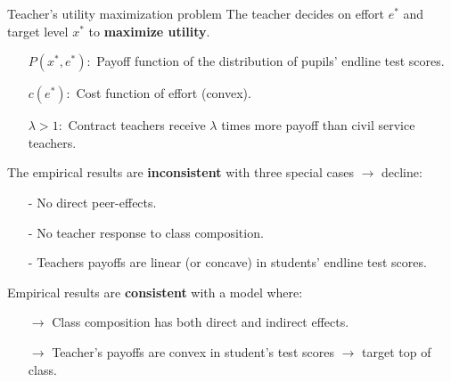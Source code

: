 \documentclass[9pt]{beamer}
\newcommand{\comment}[1]{}  %
\numberwithin{equation}{section}
\begin{document}
\begin{frame}{Teacher's utility maximization problem}
  The teacher decides on effort $e^{*}$ and target level $x^{*}$ to \textbf{maximize utility}.
  \begin{itemize}
    \item[$P(x^{*},e^{*}):$] Payoff function of the distribution of pupils' endline test scores.
    \item[$c(e^{*}):$] Cost function of effort (convex).
    \item[$\lambda>1:$] Contract teachers receive $\lambda$ times more payoff than civil service teachers.
  \end{itemize}
  The empirical results are \textbf{inconsistent} with three special cases $\rightarrow$ decline:
  \begin{itemize}
    \item[-] No direct peer-effects.
    \item[-] No teacher response to class composition.
    \item[-] Teachers payoffs are linear (or concave) in students' endline test scores.
    \comment{Teachers would target the middle of a class, i.e. the just below median pupil would receive worse teaching from tracking.}
  \end{itemize}
  Empirical results are \textbf{consistent} with a model where:
  \begin{itemize}
    \item[$\rightarrow$] Class composition has both direct and indirect effects.
    \item[$\rightarrow$] Teacher's payoffs are convex in student's test scores $\rightarrow$ target top of class.
  \end{itemize}
\end{frame}
\end{document}
